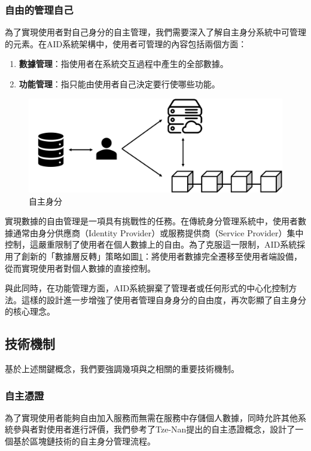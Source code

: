 \subsubsection{自由的管理自己}
為了實現使用者對自己身分的自主管理，我們需要深入了解自主身分系統中可管理的元素。在AID系統架構中，使用者可管理的內容包括兩個方面：
\begin{enumerate}
  \item \textbf{數據管理}：指使用者在系統交互過程中產生的全部數據。
  \item \textbf{功能管理}：指只能由使用者自己決定要行使哪些功能。
\end{enumerate}
\begin{figure}
  \centering
  \includegraphics[width=\linewidth,keepaspectratio]{figures/aid.png}
  \caption{自主身分}
  \label{fig:aid}
\end{figure}
實現數據的自由管理是一項具有挑戰性的任務。在傳統身分管理系統中，使用者數據通常由身分供應商（Identity Provider）或服務提供商（Service Provider）集中控制，這嚴重限制了使用者在個人數據上的自由。為了克服這一限制，AID系統採用了創新的「數據層反轉」策略如圖\ref{fig:aid}：將使用者數據完全遷移至使用者端設備，從而實現使用者對個人數據的直接控制。

與此同時，在功能管理方面，AID系統摒棄了管理者或任何形式的中心化控制方法。這樣的設計進一步增強了使用者管理自身身分的自由度，再次彰顯了自主身分的核心理念。
\subsection{技術機制}
基於上述關鍵概念，我們要強調幾項與之相關的重要技術機制。
\subsubsection{自主憑證}
為了實現使用者能夠自由加入服務而無需在服務中存儲個人數據，同時允許其他系統參與者對使用者進行評價，我們參考了Tze-Nan\cite{NTU202102846}提出的自主憑證概念，設計了一個基於區塊鏈技術的自主身分管理流程。

